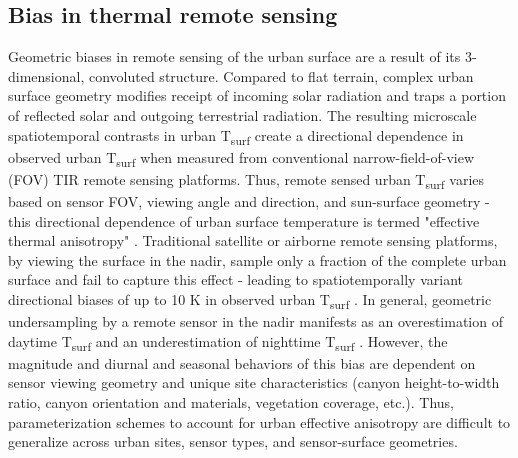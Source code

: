 \subsection{Bias in thermal remote sensing}
Geometric biases in remote sensing of the urban surface are a result of its 3-dimensional, convoluted structure. Compared to flat terrain, complex urban surface geometry modifies receipt of incoming solar radiation and traps a portion of reflected solar and outgoing terrestrial radiation. The resulting microscale spatiotemporal contrasts in urban T\textsubscript{surf} create a directional dependence in observed urban T\textsubscript{surf} when measured from conventional narrow-field-of-view (FOV) TIR remote sensing platforms. Thus, remote sensed urban T\textsubscript{surf} varies based on sensor FOV, viewing angle and direction, and sun-surface geometry - this directional dependence of urban surface temperature is termed "effective thermal anisotropy" \citep{Voogt1998a}. Traditional satellite or airborne remote sensing platforms, by viewing the surface in the nadir, sample only a fraction of the complete urban surface and fail to capture this effect - leading to spatiotemporally variant directional biases of up to 10 \si{\kelvin} in observed urban T\textsubscript{surf} \citep{Voogt1995}. In general, geometric undersampling by a remote sensor in the nadir manifests as an overestimation of daytime T\textsubscript{surf} and an underestimation of nighttime T\textsubscript{surf} \citep{Adderley2015}. However, the magnitude and diurnal and seasonal behaviors of this bias are dependent on sensor viewing geometry and unique site characteristics (canyon height-to-width ratio, canyon orientation and materials, vegetation coverage, etc.). Thus, parameterization schemes to account for urban effective anisotropy are difficult to generalize across urban sites, sensor types, and sensor-surface geometries.

